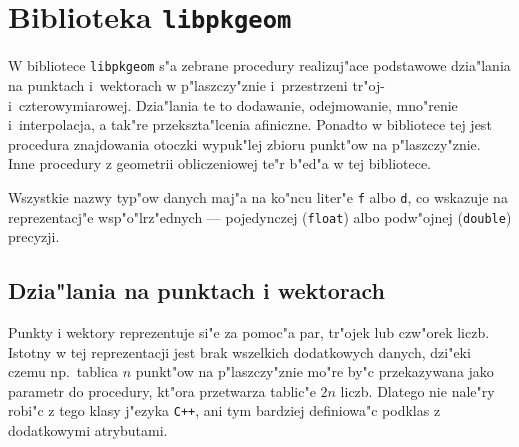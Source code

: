 

\chapter{Biblioteka \texttt{libpkgeom}}

W bibliotece \texttt{libpkgeom} s"a zebrane procedury realizuj"ace
podstawowe dzia"lania na punktach i~wektorach w p"laszczy"znie
i~przestrzeni tr"oj- i~czterowymiarowej. Dzia"lania te to dodawanie,
odejmowanie, mno"renie i~interpolacja, a tak"re przekszta"lcenia afiniczne.
Ponadto w bibliotece tej jest procedura znajdowania otoczki wypuk"lej zbioru
punkt"ow na p"laszczy"znie. Inne procedury z geometrii obliczeniowej te"r
b"ed"a w tej bibliotece.

Wszystkie nazwy typ"ow danych maj"a na ko"ncu liter"e \texttt{f} albo
\texttt{d}, co wskazuje na reprezentacj"e wsp"o"lrz"ednych --- pojedynczej
(\texttt{float}) albo podw"ojnej (\texttt{double}) precyzji.

\section{Dzia"lania na punktach i wektorach}

\hspace*{\parindent}%
Punkty i wektory reprezentuje si"e za pomoc"a par, tr"ojek lub czw"orek
liczb. Istotny w tej reprezentacji jest brak wszelkich dodatkowych danych,
dzi"eki czemu np.\ tablica $n$ punkt"ow na p"laszczy"znie mo"re by"c
przekazywana jako parametr do procedury, kt"ora przetwarza tablic"e $2n$
liczb. Dlatego nie nale"ry robi"c z tego klasy j"ezyka \texttt{C++}, ani tym
bardziej definiowa"c podklas z dodatkowymi atrybutami.

